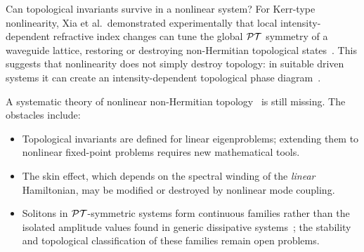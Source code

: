 Can topological invariants survive in a nonlinear system? For Kerr-type
nonlinearity, Xia et al.\ demonstrated experimentally that local
intensity-dependent refractive index changes can tune the global $\mathcal{PT}$
symmetry of a waveguide lattice, restoring or destroying non-Hermitian
topological states~\cite{xia2021nonlinear}. This suggests that
nonlinearity does not simply destroy topology: in suitable driven
systems it can create an intensity-dependent topological phase
diagram~\cite{zhen2023nonlinear,xia2021nonlinear,szameit2020nonlinearity,leykam2016edge,li2022topological,kartashov2024solitons,tang2022vector}.

A systematic theory of nonlinear non-Hermitian topology~\cite{rechtsman2013photonic,kim2020recent,maczewsky2017observation,kitagawa2010topological,rudner2013anomalous,nathan2017anomalous,guglielmon2017photonic,farrell2016edge} is still
missing. The obstacles include:
\begin{itemize}
 \item Topological invariants are defined for linear eigenproblems;
 extending them to nonlinear fixed-point problems requires new
 mathematical tools.
 \item The skin effect, which depends on the spectral winding of the
 \emph{linear} Hamiltonian, may be modified or destroyed by
 nonlinear mode coupling.
 \item Solitons in $\mathcal{PT}$-symmetric systems form continuous families
 rather than the isolated amplitude values found in generic
 dissipative systems~\cite{wimmer2015observation,alexeeva2012optical,mukherjee2021observation,johansson2025floquet,shen2023floquet,chen2025nonlinear};
 the stability and topological classification of these families remain
 open problems.
\end{itemize}

